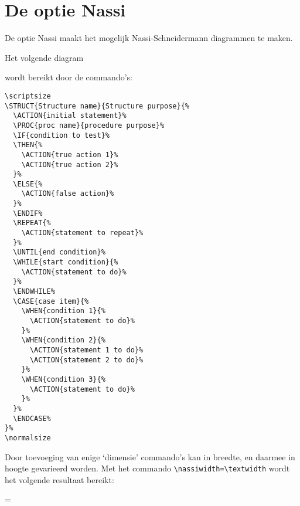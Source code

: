 \section{De optie Nassi}
De optie Nassi maakt het mogelijk Nassi-Schneidermann diagrammen te maken.

Het volgende diagram

\scriptsize
{}%
\normalsize

\vspace{0.5cm}

wordt bereikt door de commando's:

\begin{verbatim}
\scriptsize
\STRUCT{Structure name}{Structure purpose}{%
  \ACTION{initial statement}%
  \PROC{proc name}{procedure purpose}%
  \IF{condition to test}%
  \THEN{%
    \ACTION{true action 1}%
    \ACTION{true action 2}%
  }%
  \ELSE{%
    \ACTION{false action}%
  }%
  \ENDIF%
  \REPEAT{%
    \ACTION{statement to repeat}%
  }%
  \UNTIL{end condition}%
  \WHILE{start condition}{%
    \ACTION{statement to do}%
  }%
  \ENDWHILE%
  \CASE{case item}{%
    \WHEN{condition 1}{%
      \ACTION{statement to do}%
    }%
    \WHEN{condition 2}{%
      \ACTION{statement 1 to do}%
      \ACTION{statement 2 to do}%
    }%
    \WHEN{condition 3}{%
      \ACTION{statement to do}%
    }%
  }%
  \ENDCASE%
}%
\normalsize
\end{verbatim}

Door toevoeging van enige `dimensie' commando's kan in breedte, en daarmee in
hoogte gevarieerd worden. Met het commando \verb"\nassiwidth=\textwidth" wordt
het volgende resultaat bereikt:

\nassiwidth=\textwidth
\scriptsize
{}%
\normalsize




